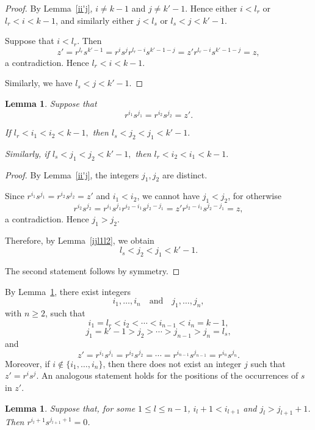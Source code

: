 \documentclass[11pt,reqno]{amsart}
\theoremstyle{plain}
\newtheorem{lem}[thm]{Lemma}
\theoremstyle{remark}
\theoremstyle{definition}
\begin{document}
\begin{proof}
By Lemma~\ref{ii'j}, $i\neq k-1$ and $j\neq k'-1$. Hence either $i<l_r$ or $l_r<i<k-1$, and similarly either $j<l_s$ or $l_s<j<k'-1$.

Suppose that $i<l_r$. Then
\[z'=r^{l_r}s^{k'-1}=r^{i}s^{j} r^{l_r-i}s^{k'-1-j}=z' r^{l_r-i}s^{k'-1-j}=z,\]
a contradiction. Hence $l_r<i<k-1$.

Similarly, 
we have \(
l_s<j<k'-1.
\)
\end{proof}

\begin{lem}\label{i1i2j1j2}
Suppose that
\[r^{i_1}s^{j_1}=r^{i_2}s^{j_2}=z'.\]

If
\(l_r<i_1<i_2<k-1,\)
then
\(l_s<j_2<j_1<k'-1.\)

Similarly, if
\(l_s<j_1<j_2<k'-1,\)
then
\(l_r<i_2<i_1<k-1.\)
\end{lem}

\begin{proof}
By Lemma~\ref{ii'j}, the integers $j_1,j_2$ are distinct.

Since
\(r^{i_1}s^{j_1}=r^{i_2}s^{j_2}=z'\)
and $i_1<i_2$, we cannot have $j_1<j_2$, for otherwise
\[r^{i_2}s^{j_2}=r^{i_1}s^{j_1}r^{i_2-i_1}s^{j_2-j_1}=z'r^{i_2-i_1}s^{j_2-j_1}=z,\]
a contradiction. Hence $j_1>j_2$.

Therefore, by Lemma~\ref{ijl1l2},
we obtain
\[l_s<j_2<j_1<k'-1.\]

The second statement follows by symmetry.
\end{proof}

By Lemma~\ref{i1i2j1j2}, there exist integers
\[
i_1,\ldots,i_n \quad\text{and}\quad j_1,\ldots,j_n,
\]
with $n\ge 2$, such that
\[
i_1=l_r<i_2<\cdots<i_{n-1}<i_n=k-1,
\]
\[
j_1=k'-1>j_2>\cdots>j_{n-1}>j_n=l_s,
\]
and
\begin{equation}\label{z'}
z'
 = r^{i_1}s^{j_1}
 = r^{i_2}s^{j_2}
 = \cdots
 = r^{i_{n-1}}s^{j_{n-1}}
 = r^{i_n}s^{j_n}.
\end{equation}
Moreover, if $i\notin\{i_1,\ldots,i_n\}$, then there does not exist an integer $j$ such that
\(z'=r^{i}s^{j}.\)
An analogous statement holds for the positions of the occurrences of $s$ in $z'$.

\begin{lem}\label{il1jl11}
Suppose that, for some $1\leq l\leq n-1$,
\(i_l+1<i_{l+1}\) and \(j_l>j_{l+1}+1\).
Then \(r^{i_l+1}s^{j_{l+1}+1}=0\).
\end{lem}
\end{document}
